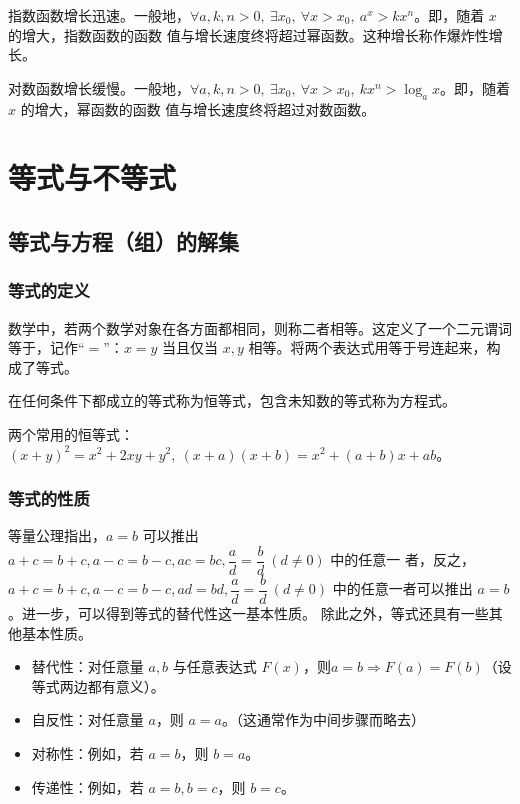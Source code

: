\documentclass[a4paper,openany]{ctexbook}
\begin{document}
指数函数增长迅速。一般地，\(\forall a,k,n>0,\ \exists x_0,\ \forall x> x_0,\ a^x>kx^n\)。即，随着 \(x\) 的增大，指数函数的函数
值与增长速度终将超过幂函数。这种增长称作爆炸性增长。

对数函数增长缓慢。一般地，\(\forall a,k,n>0,\ \exists x_0,\ \forall x>x_0,\ kx^n>\log_a x\)。即，随着 \(x\) 的增大，幂函数的函数
值与增长速度终将超过对数函数。

\section{等式与不等式}

\subsection{等式与方程（组）的解集}

\subsubsection{等式的定义}

数学中，若两个数学对象在各方面都相同，则称二者相等。这定义了一个二元谓词等于，记作“\(=\)”：\(x=y\) 当且仅当 \(x,y\) 相等。将两个表达式用等于号连起来，构成了等式。

在任何条件下都成立的等式称为恒等式，包含未知数的等式称为方程式。

两个常用的恒等式：\((x+y)^2=x^2+2xy+y^2,\ (x+a)(x+b)=x^2+(a+b)x+ab\)。

\subsubsection{等式的性质}

等量公理指出，\(a=b\) 可以推出 \(a+c=b+c,a-c=b-c,ac=bc,\dfrac{a}{d}=\dfrac{b}{d}\  (d\ne 0)\) 中的任意一
者，反之，\(a+c=b+c,a-c=b-c,ad=bd,\dfrac{a}{d}=\dfrac{b}{d}\  (d\ne 0)\) 中的任意一者可以推出 \(a=b\)。进一步，可以得到等式的替代性这一基本性质。
除此之外，等式还具有一些其他基本性质。

\begin{itemize}
    \item 替代性：对任意量 \(a,b\) 与任意表达式 \(F(x)\)，则\(a=b\Rightarrow F(a)=F(b)\)（设等式两边都有意义）。
    \item 自反性：对任意量 \(a\)，则 \(a=a\)。（这通常作为中间步骤而略去）
    \item 对称性：例如，若 \(a=b\)，则 \(b=a\)。
    \item 传递性：例如，若 \(a=b,b=c\)，则 \(b=c\)。
\end{itemize}
\end{document}
